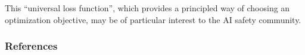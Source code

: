 \documentclass[twoside]{article}
\theoremstyle{plain}
\theoremstyle{definition}
\begin{document}

This ``universal loss function'',
which provides a principled way of choosing an optimization objective,
may be of particular interest to the AI safety community.




\subsubsection*{References}

\end{document}
